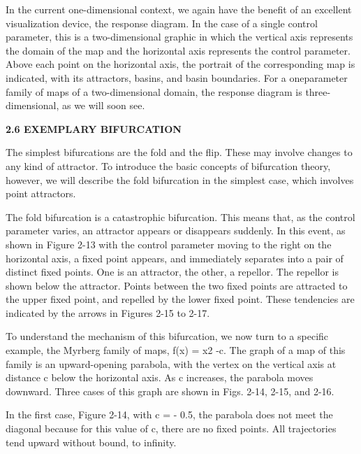 \documentclass[12pt]{article}
\begin{document}
\hfill

In the current one-dimensional context, we again have the benefit
of an excellent visualization device, the response diagram. In the
case of a single control parameter, this is a two-dimensional graphic
in which the vertical axis represents the domain of the map and the
horizontal axis represents the control parameter. Above each point
on the horizontal axis, the portrait of the corresponding map is indicated,
with its attractors, basins, and basin boundaries. For a oneparameter
family of maps of a two-dimensional domain, the
response diagram is three-dimensional, as we will soon see.

\hfill

\textbf{2.6 EXEMPLARY BIFURCATION}

\hfill

The simplest bifurcations are the fold and the flip. These may
involve changes to any kind of attractor. To introduce the basic concepts
of bifurcation theory, however, we will describe the fold
bifurcation in the simplest case, which involves point attractors.

\hfill

The fold bifurcation is a catastrophic bifurcation. This means
that, as the control parameter varies, an attractor appears or disappears
suddenly. In this event, as shown in Figure 2-13 with the
control parameter moving to the right on the horizontal axis, a fixed
point appears, and immediately separates into a pair of distinct
fixed points. One is an attractor, the other, a repellor. The repellor is
shown below the attractor. Points between the two fixed points are
attracted to the upper fixed point, and repelled by the lower fixed
point. These tendencies are indicated by the arrows in Figures 2-15
to 2-17.

\hfill

To understand the mechanism of this bifurcation, we now turn
to a specific example, the Myrberg family of maps, f(x) = x2 -c.
The graph of a map of this family is an upward-opening parabola,
with the vertex on the vertical axis at distance c below the horizontal
axis. As c increases, the parabola moves downward. Three cases
of this graph are shown in Figs. 2-14, 2-15, and 2-16.

\hfill

In the first case, Figure 2-14, with c = - 0.5, the parabola does
not meet the diagonal because for this value of c, there are no fixed
points. All trajectories tend upward without bound, to infinity.
\end{document}
